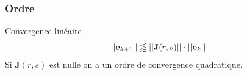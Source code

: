 \documentclass[resume]{subfiles}
\begin{document}
\subsubsection{Ordre}
Convergence linéaire
$$\abs{\abs{\mathbf{e}_{k+1}}}\lessapprox \abs{\abs{\mathbf{J}(r,s)}}\cdot \abs{\abs{\mathbf{e}_k}}$$
Si $\mathbf{J}(r,s)$ est nulle on a un ordre de convergence quadratique.
	


    
\end{document}
